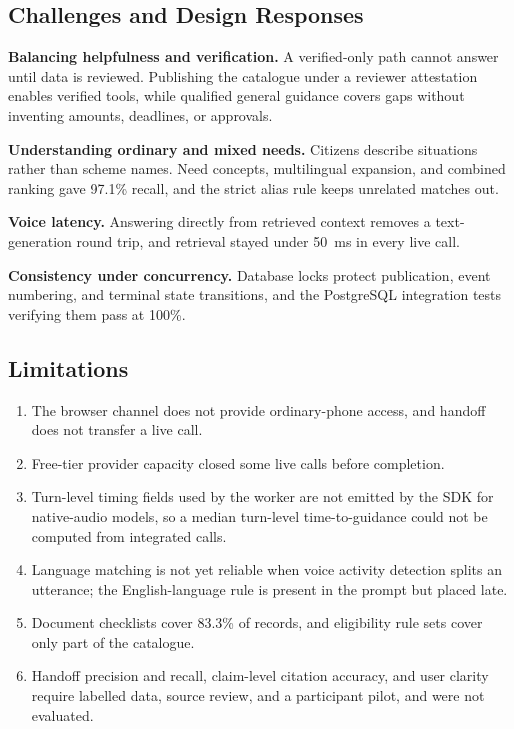 \documentclass[11pt,a4paper,oneside]{report}
\begin{document}
\subsection{Challenges and Design Responses}
\textbf{Balancing helpfulness and verification.} A verified-only path cannot answer
until data is reviewed. Publishing the catalogue under a reviewer attestation
enables verified tools, while qualified general guidance covers gaps without
inventing amounts, deadlines, or approvals.

\textbf{Understanding ordinary and mixed needs.} Citizens describe situations rather
than scheme names. Need concepts, multilingual expansion, and combined ranking gave
97.1\% recall, and the strict alias rule keeps unrelated matches out.

\textbf{Voice latency.} Answering directly from retrieved context removes a
text-generation round trip, and retrieval stayed under 50~ms in every live call.

\textbf{Consistency under concurrency.} Database locks protect publication,
event numbering, and terminal state transitions, and the PostgreSQL integration
tests verifying them pass at 100\%.

\subsection{Limitations}
\begin{enumerate}
  \item The browser channel does not provide ordinary-phone access, and handoff
    does not transfer a live call.
  \item Free-tier provider capacity closed some live calls before completion.
  \item Turn-level timing fields used by the worker are not emitted by the SDK for
    native-audio models, so a median turn-level time-to-guidance could not be
    computed from integrated calls.
  \item Language matching is not yet reliable when voice activity detection splits
    an utterance; the English-language rule is present in the prompt but placed late.
  \item Document checklists cover 83.3\% of records, and eligibility rule sets
    cover only part of the catalogue.
  \item Handoff precision and recall, claim-level citation accuracy, and user
    clarity require labelled data, source review, and a participant pilot, and were
    not evaluated.
\end{enumerate}
\end{document}
